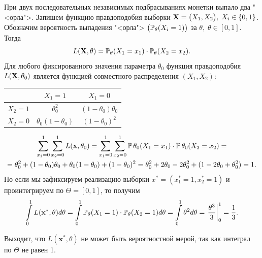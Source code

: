 \begin{exmp}
    При двух последовательных независимых подбрасываниях монетки выпало два "<орла">.
    Запишем функцию правдоподобия выборки $\mathbf{X}= \bigl(X_1, X_2\bigr), \; X_i \in \{0, 1\}$.
    Обозначим вероятность выпадения "<орла"> ${\bigl(\operatorname{\operatorname{\mathbb{P}}_{\theta}}(X_i = 1)\bigr)}$ за $\theta, \; \theta \in [0, 1]$.
    Тогда
    \begin{equation*}
        L(\mathbf{X}, \theta) = \operatorname{\operatorname{\mathbb{P}}_{\theta}} (X_1 = x_1) \cdot \operatorname{\operatorname{\mathbb{P}}_{\theta}} (X_2 = x_2).
    \end{equation*}
    Для любого фиксированного значения параметра $\theta_0$ функция правдоподобия $L(\mathbf{X}, \theta_0)$ является функцией совместного распределения $(X_1, X_2)$:
    \begin{center}
        \begin{tabular}{|c|c|c|}
            \hline
            & $X_1 = 1$ & $X_1 = 0$ \\
            \hline
            $X_2 = 1$ & $\theta^2_0$ & $(1-\theta_0)\theta_0$ \\
            \hline
            $X_2 = 0$ & $\theta_0(1-\theta_0)$ & $(1-\theta_0)^2$ \\
            \hline
        \end{tabular}
    \end{center}
    \begin{gather*}
        \sum\limits_{x_1 = 0}^{1} \sum\limits_{x_2 = 0}^{1} L(\mathbf{x}, \theta_0) = 
        \sum\limits_{x_1 = 0}^{1} \sum\limits_{x_2 = 0}^{1} \operatorname{\mathbb{P}}{\theta_0} (X_1 = x_1) \cdot \operatorname{\mathbb{P}}{\theta_0} (X_2 = x_2) = \\
        = \theta_0^2 + (1 - \theta_0)\theta_0 + \theta_0(1-\theta_0) + (1 - \theta_0)^2 
        = \theta_0^2 + 2\theta_0 - 2\theta_0^2 + (1 - 2\theta_0 + \theta_0^2)
        = 1.
    \end{gather*}
    Но если мы зафиксируем реализацию выборки $x^* = (x_{1}^{*} = 1, x_{2}^{*} = 1)$ и проинтегрируем по $\Theta = [0, 1]$, то получим
    \begin{equation*}
        \int\limits_0^1 L(\mathbf{x}^*, \theta) d\theta = 
        \int\limits_0^1 \operatorname{\operatorname{\mathbb{P}}_{\theta}}(X_1 = 1) \cdot \operatorname{\operatorname{\mathbb{P}}_{\theta}}(X_2 = 1) d\theta = 
        \int\limits_0^1 \theta^2 d\theta = 
        \left. \frac{\theta^3}{3} \right|_0^1 = 
        \frac{1}{3}.
    \end{equation*}

    Выходит, что $L(\mathbf{x}^*, \theta)$ не может быть вероятностной мерой, так как интеграл по $\Theta$ не равен 1.
\end{exmp}

